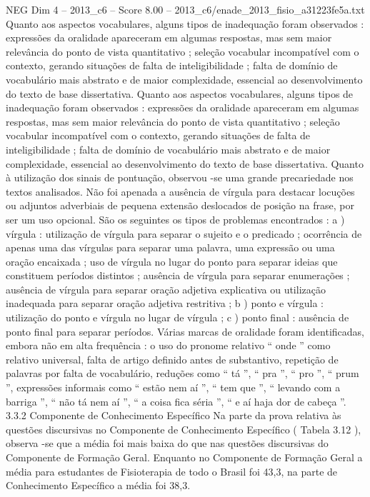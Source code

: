\begin{textsample}{NEG Dim 4 – 2013\_c6 – Score 8.00 – 2013\_c6/enade\_2013\_fisio\_a31223fe5a.txt}
Quanto aos aspectos vocabulares, alguns tipos de inadequação foram observados : expressões da oralidade apareceram em algumas respostas, mas sem maior relevância do ponto de vista quantitativo ; seleção vocabular incompatível com o contexto, gerando situações de falta de inteligibilidade ; falta de domínio de vocabulário mais abstrato e de maior complexidade, essencial ao desenvolvimento do texto de base dissertativa.
Quanto aos aspectos vocabulares, alguns tipos de inadequação foram observados : expressões da oralidade apareceram em algumas respostas, mas sem maior relevância do ponto de vista quantitativo ; seleção vocabular incompatível com o contexto, gerando situações de falta de inteligibilidade ; falta de domínio de vocabulário mais abstrato e de maior complexidade, essencial ao desenvolvimento do texto de base dissertativa.
Quanto à utilização dos sinais de pontuação, observou -se uma grande precariedade nos textos analisados.
Não foi apenada a ausência de vírgula para destacar locuções ou adjuntos adverbiais de pequena extensão deslocados de posição na frase, por ser um uso opcional.
São os seguintes os tipos de problemas encontrados : a ) vírgula : utilização de vírgula para separar o sujeito e o predicado ; ocorrência de apenas uma das vírgulas para separar uma palavra, uma expressão ou uma oração encaixada ; uso de vírgula no lugar do ponto para separar ideias que constituem períodos distintos ; ausência de vírgula para separar enumerações ; ausência de vírgula para separar oração adjetiva explicativa ou utilização inadequada para separar oração adjetiva restritiva ; b ) ponto e vírgula : utilização do ponto e vírgula no lugar de vírgula ; c ) ponto final : ausência de ponto final para separar períodos.
Várias marcas de oralidade foram identificadas, embora não em alta frequência : o uso do pronome relativo “ onde ” como relativo universal, falta de artigo definido antes de substantivo, repetição de palavras por falta de vocabulário, reduções como “ tá ”, “ pra ”, “ pro ”, “ prum ”, expressões informais como “ estão nem aí ”, “ tem que ”, “ levando com a barriga ”, “ não tá nem aí ”, “ a coisa fica séria ”, “ e aí haja dor de cabeça ”. 3.3.2 Componente de Conhecimento Específico Na parte da prova relativa às questões discursivas no Componente de Conhecimento Específico ( Tabela 3.12 ), observa -se que a média foi mais baixa do que nas questões discursivas do Componente de Formação Geral.
Enquanto no Componente de Formação Geral a média para estudantes de Fisioterapia de todo o Brasil foi 43,3, na parte de Conhecimento Específico a média foi 38,3.

\end{textsample}
